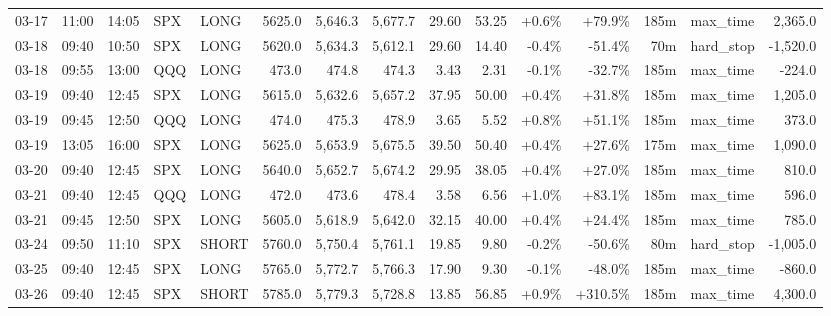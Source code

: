 \documentclass[11pt,a4paper,twoside]{article}
\begin{document}
\begin{landscape}
\begin{center}
\begin{longtable}{>{\color{txtmain}}l l l l l r r r r r r r r >{\color{txtmain}}l r}
03-17 & 11:00 & 14:05 & SPX & LONG & 5625.0 & 5,646.3 & 5,677.7 & 29.60 & 53.25 & \textcolor{wingreen}{+0.6\%} & \textcolor{wingreen}{+79.9\%} & 185m & max\_time & \textcolor{wingreen}{2,365.0} \\
03-18 & 09:40 & 10:50 & SPX & LONG & 5620.0 & 5,634.3 & 5,612.1 & 29.60 & 14.40 & \textcolor{lossred}{-0.4\%} & \textcolor{lossred}{-51.4\%} & 70m & hard\_stop & \textcolor{lossred}{-1,520.0} \\
03-18 & 09:55 & 13:00 & QQQ & LONG & 473.0 & 474.8 & 474.3 & 3.43 & 2.31 & \textcolor{lossred}{-0.1\%} & \textcolor{lossred}{-32.7\%} & 185m & max\_time & \textcolor{lossred}{-224.0} \\
03-19 & 09:40 & 12:45 & SPX & LONG & 5615.0 & 5,632.6 & 5,657.2 & 37.95 & 50.00 & \textcolor{wingreen}{+0.4\%} & \textcolor{wingreen}{+31.8\%} & 185m & max\_time & \textcolor{wingreen}{1,205.0} \\
03-19 & 09:45 & 12:50 & QQQ & LONG & 474.0 & 475.3 & 478.9 & 3.65 & 5.52 & \textcolor{wingreen}{+0.8\%} & \textcolor{wingreen}{+51.1\%} & 185m & max\_time & \textcolor{wingreen}{373.0} \\
03-19 & 13:05 & 16:00 & SPX & LONG & 5625.0 & 5,653.9 & 5,675.5 & 39.50 & 50.40 & \textcolor{wingreen}{+0.4\%} & \textcolor{wingreen}{+27.6\%} & 175m & max\_time & \textcolor{wingreen}{1,090.0} \\
03-20 & 09:40 & 12:45 & SPX & LONG & 5640.0 & 5,652.7 & 5,674.2 & 29.95 & 38.05 & \textcolor{wingreen}{+0.4\%} & \textcolor{wingreen}{+27.0\%} & 185m & max\_time & \textcolor{wingreen}{810.0} \\
03-21 & 09:40 & 12:45 & QQQ & LONG & 472.0 & 473.6 & 478.4 & 3.58 & 6.56 & \textcolor{wingreen}{+1.0\%} & \textcolor{wingreen}{+83.1\%} & 185m & max\_time & \textcolor{wingreen}{596.0} \\
03-21 & 09:45 & 12:50 & SPX & LONG & 5605.0 & 5,618.9 & 5,642.0 & 32.15 & 40.00 & \textcolor{wingreen}{+0.4\%} & \textcolor{wingreen}{+24.4\%} & 185m & max\_time & \textcolor{wingreen}{785.0} \\
03-24 & 09:50 & 11:10 & SPX & SHORT & 5760.0 & 5,750.4 & 5,761.1 & 19.85 & 9.80 & \textcolor{lossred}{-0.2\%} & \textcolor{lossred}{-50.6\%} & 80m & hard\_stop & \textcolor{lossred}{-1,005.0} \\
03-25 & 09:40 & 12:45 & SPX & LONG & 5765.0 & 5,772.7 & 5,766.3 & 17.90 & 9.30 & \textcolor{lossred}{-0.1\%} & \textcolor{lossred}{-48.0\%} & 185m & max\_time & \textcolor{lossred}{-860.0} \\
03-26 & 09:40 & 12:45 & SPX & SHORT & 5785.0 & 5,779.3 & 5,728.8 & 13.85 & 56.85 & \textcolor{wingreen}{+0.9\%} & \textcolor{wingreen}{+310.5\%} & 185m & max\_time & \textcolor{wingreen}{4,300.0} \\

\end{longtable}
\end{center}
\end{landscape}
\end{document}
